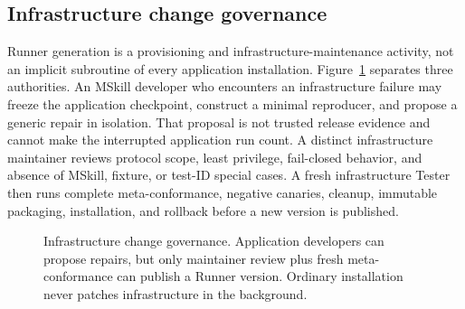 \documentclass[10pt]{article}
\begin{document}
\subsection{Infrastructure change governance}

Runner generation is a provisioning and infrastructure-maintenance activity, not an implicit
subroutine of every application installation. Figure~\ref{fig:infra-governance} separates three
authorities. An MSkill developer who encounters an infrastructure failure may freeze the
application checkpoint, construct a minimal reproducer, and propose a generic repair in isolation.
That proposal is not trusted release evidence and cannot make the interrupted application run
count. A distinct infrastructure maintainer reviews protocol scope, least privilege, fail-closed
behavior, and absence of MSkill, fixture, or test-ID special cases. A fresh infrastructure Tester
then runs complete meta-conformance, negative canaries, cleanup, immutable packaging, installation,
and rollback before a new version is published.

\begin{figure}[H]
\centering
{}
\caption{Infrastructure change governance. Application developers can propose repairs, but only
maintainer review plus fresh meta-conformance can publish a Runner version. Ordinary installation
never patches infrastructure in the background.}
\label{fig:infra-governance}
\end{figure}
\end{document}
